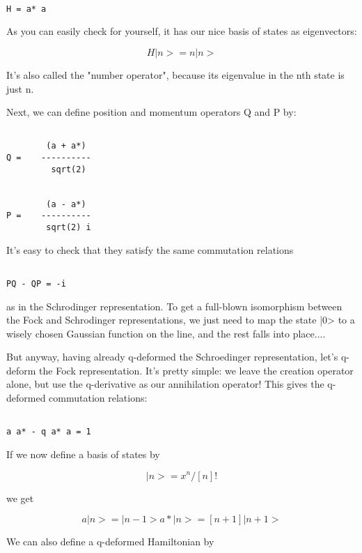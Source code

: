 \begin{verbatim}

H = a* a
\end{verbatim}
    
As you can easily check for yourself, it has our nice basis of states 
as eigenvectors:


$$

H|n> = n |n>
$$
    
It's also called the "number operator", because its eigenvalue in the
nth state is just n.

Next, we can define position and momentum operators Q and P by:
      

\begin{verbatim}

        (a + a*) 
Q =    ----------
         sqrt(2)


        (a - a*) 
P =    ----------
        sqrt(2) i
\end{verbatim}
    
It's easy to check that they satisfy the same commutation relations


\begin{verbatim}

PQ - QP = -i
\end{verbatim}
    
as in the Schrodinger representation.  To get a full-blown isomorphism
between the Fock and Schrodinger representations, we just need to map
the state |0> to a wisely chosen Gaussian function on the line, and
the rest falls into place....

But anyway, having already q-deformed the Schroedinger representation,
let's q-deform the Fock representation.  It's pretty simple: we leave
the creation operator alone, but use the q-derivative as our annihilation
operator!  This gives the q-deformed commutation relations:


\begin{verbatim}

a a* - q a* a = 1
\end{verbatim}
    
If we now define a basis of states by 


$$

|n> = x^{n} / [n]!
$$
    
we get 

$$

 a|n>  =        |n-1>
a*|n>  =  [n+1] |n+1>
$$
    
We can also define a q-deformed Hamiltonian by


